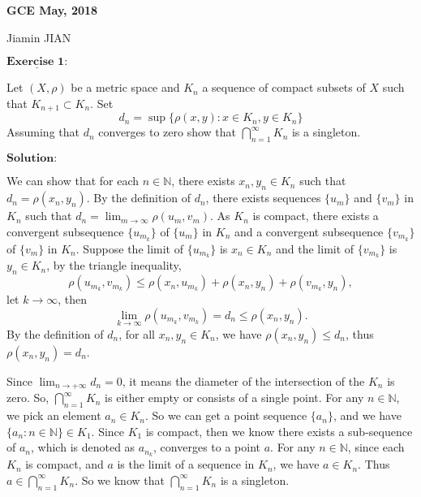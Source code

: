 \documentclass[12pt,a4paper]{ctexart}
\begin{document}
\begin{center}
\textbf{ GCE May, 2018}
\vspace{8pt}

Jiamin JIAN
\end{center}

\vspace{12pt}

$\underline{\textbf{Exercise 1:}}$

Let $(X, \rho)$ be a metric space and $K_{n}$ a sequence of compact subsets of $X$ such that $K_{n+1} \subset K_{n}$. Set
\begin{equation*}
   d_{n} = \sup \{ \rho (x, y): x \in K_{n}, y \in K_{n} \}
\end{equation*}
Assuming that $d_{n}$ converges to zero show that $\bigcap_{n = 1}^{\infty} K_{n}$ is a singleton.

\vspace{8pt}

$\textbf{Solution:}$

We can show that for each $n \in \mathbb N$, there exists $x_n, y_n \in K_n$ such that $d_n = \rho(x_n, y_n)$. By the definition of $d_n$, there exists sequences $\{u_m \}$ and $\{v_m \}$ in $K_n$ such that $d_n = \lim_{m \to \infty}  \rho(u_m, v_m)$. As $K_n$ is compact, there exists a convergent subsequence $\{u_{m_k}\}$ of $\{u_m \}$ in $K_n$ and a convergent subsequence $\{v_{m_k}\}$ of $\{v_m \}$ in $K_n$. Suppose the limit of $\{u_{m_k}\}$ is $x_n \in K_n$ and the limit of $\{v_{m_k}\}$ is $y_n \in K_n$, by the triangle inequality,
$$\rho(u_{m_k}, v_{m_k}) \leq \rho(x_n, u_{m_k}) + \rho(x_n, y_n) + \rho(v_{m_k}, y_n),$$
let $k \to \infty$, then
$$\lim_{k \to \infty} \rho(u_{m_k}, v_{m_k}) = d_n \leq \rho(x_n, y_n).$$
By the definition of $d_n$, for all $x_n, y_n \in K_n$, we have $\rho(x_n, y_n) \leq d_n$, thus $\rho(x_n, y_n) = d_n$.

Since $\lim_{n \to + \infty} d_{n} = 0$, it means the diameter of the intersection of the $K_{n}$ is zero. So, $\bigcap_{n = 1}^{\infty} K_{n}$ is either empty or consists of a single point. For any $n \in \mathbb{N}$, we pick an element $a_{n} \in K_{n}$. So we can get a point sequence $\{a_{n}\}$, and we have $\{a_{n}: n \in \mathbb{N}\} \in K_{1}$. Since $K_{1}$ is compact, then we know there exists a sub-sequence of $a_{n}$, which is denoted as $a_{n_{k}}$, converges to a point $a$. For any $n \in \mathbb{N}$, since each $K_{n}$ is compact, and $a$ is the limit of a sequence in $K_{n}$, we have $a \in K_{n}$. Thus $a \in \bigcap_{n = 1}^{\infty} K_{n}$. So we know that $\bigcap_{n = 1}^{\infty} K_{n}$ is a singleton.
\end{document}
